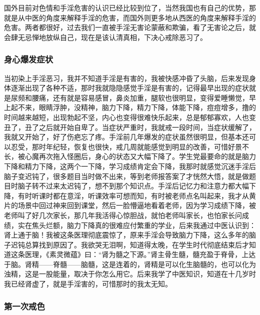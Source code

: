 国外目前对色情和手淫危害的认识已经比较到位了，当然我国也有自己的优势，那就是从中医的角度来解释手淫的危害，而国外则更多地从西医的角度来解释手淫的危害。两者都很好，过去我们一直被手淫无害论蒙蔽和欺骗，看了无害论之后，就会肆无忌惮地放纵自己，现在是该认清真相，下决心戒除恶习了。

\subsubsection{身心爆发症状}

当初染上手淫恶习，我并不知道手淫是有害的，我被快感冲昏了头脑，后来发现身体逐渐出现了各种不适，那时我就隐隐感觉手淫是有害的，记得最早出现的症状就是尿频和腰痛，还有就是容易感冒，鼻炎加重，腿软也很明显，变得爱睡懒觉，早上起不来，眼睛浮肿，没精神，脑力下降，精力下降，体能下降，痘痘增多，撸的时间越来越短，出现勃起不坚，内心也变得很难快乐起来，总是郁郁寡欢，人也变丑了，丑了之后就开始自卑了。当症状严重时，我就戒一段时间，当症状缓解了，我就又开始了，好了伤疤忘了疼。手淫前几年爆发的症状虽然很明显，但基本还可以忍受，那时年纪轻，恢复也很快，戒几周就能感觉到明显的改善，可惜好景不长，被心魔再次拖入怪圈后，身心的状态又大幅下降了。学生党最要命的就是脑力下降和精力下降，这两个一下降，学习成绩肯定会下降，我那时就感觉沉迷手淫后脑子变迟钝了，很多题目当时做不出来，等到老师报答案了才恍然大悟，就是做题目时脑子转不过来太迟钝了，想不到那个知识点。手淫后记忆力和注意力都大幅下降，有时听课时都在意淫，听课效率可想而知，有时被老师点名叫起来，我才从黄片的场景中回过神来回到课堂，然后一脸懵逼地看着老师，因为学习成绩下降，被老师叫了好几次家长，那几年我活得心惊胆战，就怕老师叫家长，也怕家长问成绩，实在焦头烂额，脑力下降真的很难应付繁重的学业，后来我通过中医认识到：肾上通于脑！我被这条医理彻底震惊了，原来手淫会导致脑力下降，这么多年的脑子迟钝总算找到原因了。我欲哭无泪啊，知道得太晚，在学生时代彻底结束后才知道这条医理，《素灵微蕴》曰：“肾为髓之下源。”肾主骨生髓，髓充盈于脊骨，上达于脑。肾精——脊髓——脑髓，这是连着的，肾精是可以化生脑髓的，也可以化为浊精，这是一股能量，取决于你怎么用它。后来我学了中医知识，知道在十几岁时我已经肾虚了，就是手淫害的，可惜那时的我太无知。

\subsubsection{第一次戒色}


